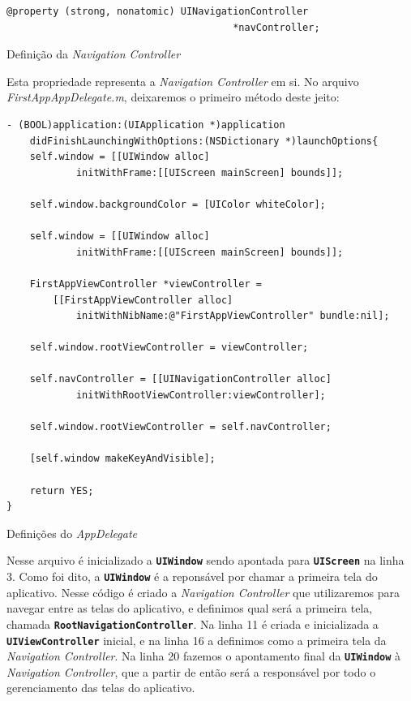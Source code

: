 \documentclass[a4paper,12pt,brazil,doubleside]{book}
\begin{document}
\begin{singlespace}
\begin{listing}
\begin{verbatim}
@property (strong, nonatomic) UINavigationController
									   *navController;
\end{verbatim}
\caption{Definição da \emph{Navigation Controller}}
\end{listing}


Esta propriedade representa a \emph{Navigation Controller} em si. No arquivo \emph{FirstAppAppDelegate.m}, deixaremos o primeiro método deste jeito:

\begin{listing}[H]
\begin{verbatim}
- (BOOL)application:(UIApplication *)application 
	didFinishLaunchingWithOptions:(NSDictionary *)launchOptions{
    self.window = [[UIWindow alloc] 
    		initWithFrame:[[UIScreen mainScreen] bounds]];

    self.window.backgroundColor = [UIColor whiteColor];
    
    self.window = [[UIWindow alloc] 
    		initWithFrame:[[UIScreen mainScreen] bounds]];
    
    FirstAppViewController *viewController =
    	[[FirstAppViewController alloc] 
    		initWithNibName:@"FirstAppViewController" bundle:nil];
    
    self.window.rootViewController = viewController;

    self.navController = [[UINavigationController alloc] 
    		initWithRootViewController:viewController];
    
    self.window.rootViewController = self.navController;
    
    [self.window makeKeyAndVisible];
    
    return YES;
}
\end{verbatim}
\caption{Definições do \emph{AppDelegate}}
\end{listing}


Nesse arquivo é inicializado a \texttt{\textbf{UIWindow}} sendo apontada para \texttt{\textbf{UIScreen}} na linha 3. Como foi dito, a \texttt{\textbf{UIWindow}} é a reponsável por chamar a primeira tela do aplicativo. Nesse código é criado a \emph{Navigation Controller} que utilizaremos para navegar entre as telas do aplicativo, e definimos qual será a primeira tela, chamada \texttt{\textbf{RootNavigationController}}. Na linha 11 é criada e inicializada a \texttt{\textbf{UIViewController}} inicial, e na linha 16 a definimos como a primeira tela da \emph{Navigation Controller}. Na linha 20 fazemos o apontamento final da \texttt{\textbf{UIWindow}} à \emph{Navigation Controller}, que a partir de então será a responsável por todo o gerenciamento das telas do aplicativo.


\end{singlespace}
\end{document}
